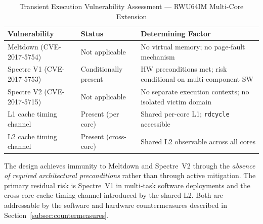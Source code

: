 \begin{table}[h]
  \centering
  \caption{Transient Execution Vulnerability Assessment — RWU64IM Multi-Core Extension}
  \label{tab:vuln_summary_ch7}
  \begin{tabular}{lll}
    \hline
    \textbf{Vulnerability}     & \textbf{Status}       & \textbf{Determining Factor} \\
    \hline
    Meltdown (CVE-2017-5754)   & Not applicable        &
    No virtual memory; no page-fault mechanism                                       \\
    Spectre V1 (CVE-2017-5753) & Conditionally present &
    HW preconditions met; risk conditional on multi-component SW                     \\
    Spectre V2 (CVE-2017-5715) & Not applicable        &
    No separate execution contexts; no isolated victim domain                        \\
    L1 cache timing channel    & Present (per core)    &
    Shared per-core L1; \texttt{rdcycle} accessible                                  \\
    L2 cache timing channel    & Present (cross-core)  &
    Shared L2 observable across all cores                                            \\
    \hline
  \end{tabular}
\end{table}

The design achieves immunity to Meltdown and Spectre~V2 through the
\emph{absence of required architectural preconditions} rather than through
active mitigation. The primary residual risk is Spectre~V1 in multi-task
software deployments and the cross-core cache timing channel introduced by the
shared \mbox{L2}. Both are addressable by the software and hardware
countermeasures described in Section~\ref{subsec:countermeasures}.
